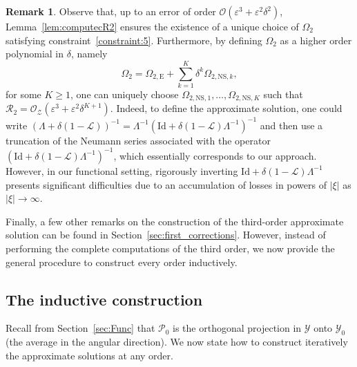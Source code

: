 \documentclass[11pt,reqno,a4paper]{amsart}
\def\eps{\varepsilon}
\newcommand{\cL}{\mathcal{L}}
\newcommand{\cO}{\mathcal{O}}
\newcommand{\cP}{\mathcal{P}}
\newcommand{\cR}{\mathcal{R}}
\newcommand{\cY}{\mathcal{Y}}
\newcommand{\cZ}{\mathcal{Z}}
\newcommand{\1}{\mathbbm{1}}
\theoremstyle{definition}
\newtheorem{remark}[proposition]{Remark}
\theoremstyle{definition}
\numberwithin{equation}{section}
\begin{document}
\begin{remark}
\label{rem:NSdelta}
Observe that, up to an error of order $\cO(\eps^3 + \eps^2\delta^2)$, Lemma~\ref{lem:computecR2} ensures the existence of a unique choice of $\Omega_2$ satisfying constraint~\ref{constraint:5}. Furthermore, by defining $\Omega_2$ as a higher order polynomial in $\delta$, namely
\begin{equation}
    \Omega_2 = \Omega_{2,\mathrm{E}} + \sum_{k=1}^K \delta^k \Omega_{2,\mathrm{NS},k},
\end{equation}
for some $K \ge 1$, one can uniquely choose $\Omega_{2,\mathrm{NS},1},\ldots,\Omega_{2,\mathrm{NS},K}$ such that $\cR_{2} = \cO_\cZ(\eps^3 + \eps^2 \delta^{K+1})$. Indeed, to define the approximate solution, one could write $(\Lambda+\delta(1-\cL))^{-1}=\Lambda^{-1}(\mathrm{Id}+\delta(1-\cL)\Lambda^{-1})^{-1}$ and then use a truncation of the Neumann series associated with the operator $(\mathrm{Id}+\delta(1-\cL)\Lambda^{-1})^{-1}$, which essentially corresponds to our approach. However, in our functional setting, rigorously inverting $\mathrm{Id}+\delta(1-\cL)\Lambda^{-1}$ presents significant difficulties due to an accumulation of losses in powers of $|\xi|$ as $|\xi|\to \infty.$
\end{remark}

Finally, a few other remarks on the construction of the third-order approximate solution can be found in Section~\ref{sec:first_corrections}. However, instead of performing the complete computations of the third order, we now provide the general procedure to construct every order inductively.

\subsection{The inductive construction}\label{sec:iterative}


Recall from Section~\ref{sec:Func} that $\cP_0$ is the orthogonal projection in $\cY$ onto $\cY_0$ (the average in the angular direction).
We now state how to construct iteratively the approximate solutions at any order.
\end{document}
